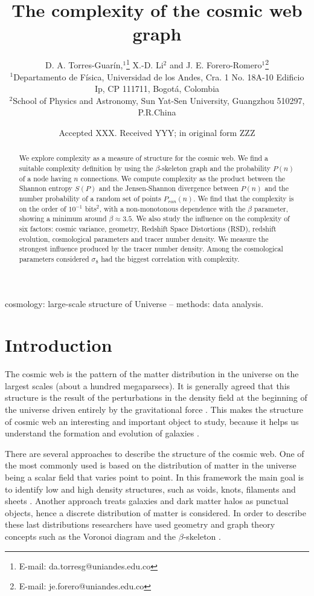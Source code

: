 \documentclass[fleqn,usenatbib]{mnras}
\title[Cosmic Web Graph Complexity]{The complexity of the cosmic web graph}
\author[Torres-Guar\'in et al.]{
D. A. Torres-Guar\'in,$^{1}$\thanks{E-mail:
  da.torresg@uniandes.edu.co} 
X.-D. Li$^{2}$
and J. E. Forero-Romero$^{1}$\thanks{E-mail:
  je.forero@uniandes.edu.co} 
\\
$^{1}$Departamento de F\'isica, Universidad de los Andes, Cra. 1
No. 18A-10 Edificio Ip, CP 111711, Bogot\'a, Colombia\\ 
$^{2}$School of Physics and Astronomy, Sun Yat-Sen University,
Guangzhou 510297, P.R.China\\ 
}
\date{Accepted XXX. Received YYY; in original form ZZZ}
\begin{document}
\label{firstpage}
\pagerange{\pageref{firstpage}--\pageref{lastpage}}
\maketitle

\begin{abstract}
We explore complexity as a measure of structure for the cosmic web. 
We find a suitable complexity definition by using the $\beta$-skeleton graph and
the probability $P(n)$ of a node having $n$ connections. 
We compute complexity as the product between the Shannon entropy
$S(P)$ and the Jensen-Shannon divergence  between $P(n)$ and the number
probability of a random set of points $P_{ran}(n)$. 
We find that the complexity is on the order of $10^{-1}$ bits$^2$,
with a non-monotonous dependence with the $\beta$ parameter, showing
a minimum around $\beta\approx3.5$.
We also study the influence on the  complexity of six factors:  cosmic
variance, geometry, Redshift Space Distortions (RSD), redshift
evolution, cosmological parameters and tracer number density. 
We measure the strongest influence produced by the tracer number density.
Among the cosmological parameters considered $\sigma_{8}$ had the
biggest correlation with complexity.  

\end{abstract}
\begin{keywords}
cosmology: large-scale structure of Universe -- methods: data analysis.
\end{keywords}


\section{Introduction}
The cosmic web is the pattern of the matter distribution in the
universe on the largest scales (about a hundred megaparsecs). 
It is generally agreed that this structure is the result of the
perturbations in the density field at the beginning of the universe
driven entirely by the gravitational force \cite{cosmic_web}. 
This makes the structure of cosmic web an interesting and important object
to study, because it helps us understand the formation and evolution
of galaxies \cite{Cautun_2014}.

There are several approaches to describe the structure of the cosmic
web. One of the most commonly used is based on the distribution of
matter in the universe being a scalar field that varies point to
point. In this framework the main goal is to identify low and high
density structures, such as voids, knots, filaments and sheets
\cite{2018MNRAS.473.1195L}. Another approach treats galaxies and dark
matter halos as punctual objects, hence a discrete distribution of
matter is considered. In order to describe these last distributions
researchers have used geometry and graph theory concepts such as the
Voronoi diagram \cite{voronoi} and the $\beta$-skeleton
\cite{beta_skeleton}.
\end{document}
